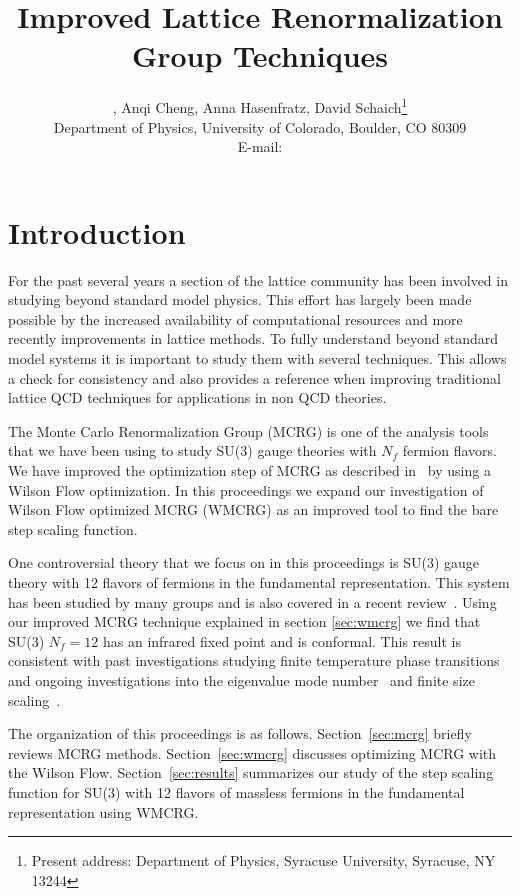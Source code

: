 \documentclass{PoS}
\title{Improved Lattice Renormalization Group Techniques}
\author{\speaker{Gregory Petropoulos}, Anqi Cheng, Anna Hasenfratz, David Schaich\footnote{Present address: Department of Physics, Syracuse University, Syracuse, NY 13244} \\
        Department of Physics, University of Colorado, Boulder, CO 80309 \\
        E-mail: \email{gregory.petropoulos@colorado.edu}}
\newcommand{\secref}[1]{Section~\ref{#1}}
\begin{document}
\section{Introduction}
For the past several years a section of the lattice community has been involved in studying beyond standard model physics.
This effort has largely been made possible by the increased availability of computational resources and more recently improvements in lattice methods.
To fully understand beyond standard model systems it is important to study them with several techniques.
This allows a check for consistency and also provides a reference when improving traditional lattice QCD techniques for applications in non QCD theories.

The Monte Carlo Renormalization Group (MCRG) is one of the analysis tools that we have been using to study SU(3) gauge theories with $N_f$ fermion flavors.
We have improved the optimization step of MCRG as described in~\cite{Petropoulos:2012mg} by using a Wilson Flow optimization.
In this proceedings we expand our investigation of Wilson Flow optimized MCRG (WMCRG) as an improved tool to find the bare step scaling function.

One controversial theory that we focus on in this proceedings is SU(3) gauge theory with 12 flavors of fermions in the fundamental representation.
This system has been studied by many groups \cite{Appelquist:2009ty, Deuzeman:2009mh, Fodor:2011tu, Hasenfratz:2011xn, DeGrand:2011cu, Cheng:2011ic, Fodor:2012uw, Fodor:2012et, Appelquist:2011dp, Aoki:2012eq, Aoki:2013pca, Itou:2012qn, Lin:2012iw, Jin:2012dw, Cheng:2013eu, Hasenfratz:2013uha, Hasenfratz:2013eka} and is also covered in a recent review~\cite{Giedt:2012LAT}.
Using our improved MCRG technique explained in section \ref{sec:wmcrg} we find that SU(3) $N_f = 12$ has an infrared fixed point and is conformal.
This result is consistent with past investigations studying finite temperature phase transitions~\cite{Schaich:2012fr, Hasenfratz:2013uha} and ongoing investigations into the eigenvalue mode number~\cite{Cheng:2013eu} and finite size scaling~\cite{Hasenfratz:2013eka}.

The organization of this proceedings is as follows.
\secref{sec:mcrg} briefly reviews MCRG methods.
\secref{sec:wmcrg} discusses optimizing MCRG with the Wilson Flow.
\secref{sec:results} summarizes our study of the step scaling function for SU(3) with 12 flavors of massless fermions in the fundamental representation using WMCRG.
\end{document}
